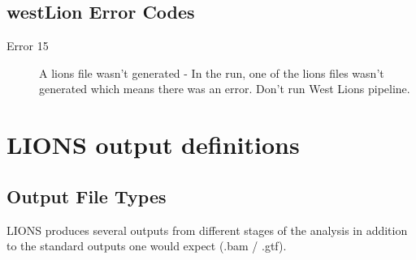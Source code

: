 \documentclass[11pt]{scrartcl}
\begin{document}
\subsection{westLion Error Codes}

\begin{description}
\item[Error 15] A lions file wasn't generated -
  In the run, one of the lions files wasn't generated which means there
was an error. Don't run West Lions pipeline.
\end{description}





\clearpage
\section{LIONS output definitions}

\subsection{Output File Types}

LIONS produces several outputs from different stages of the analysis in addition to the standard outputs one would expect (.bam / .gtf).
\end{document}
